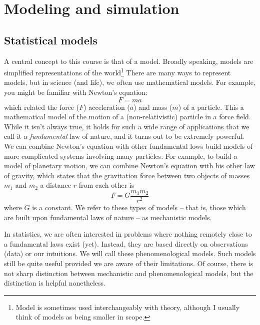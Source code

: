 \chapter{Modeling and simulation}
\section{Statistical models}

A central concept to this course is that of a {\dfn model}. %
Broadly speaking, models are simplified representations of the world\footnote{Model is sometimes used interchangeably with {\dfn theory}, although I usually think of models as being smaller in scope.} There are many ways to represent models, but in science (and life), we often use {\dfn mathematical models}.
For example, you might be familiar with Newton's equation:
\begin{equation}\label{eq:fma}
F = ma
\end{equation}
which related the force ($F$) acceleration ($a$) and mass ($m$) of a particle. This a mathematical model of the motion of a  (non-relativistic) particle in a force field. While it isn't always true, it holds for such a wide range of applications that we call it a \emph{fundamental} law of nature, and it turns out to be extremely powerful. We can combine Newton's equation with other fundamental lows build models of more complicated systems involving many particles. For example, to build a model of planetary motion, we can combine Newton's equation with his other law of gravity, which states that the gravitation force between two objects of masses $m_1$ and $m_2$ a distance $r$ from each other is
\begin{equation}
F = G\frac{m_1m_2}{r^2}
\end{equation}
where $G$ is a constant.
We refer to these types of models -- that is, those which are built upon fundamental laws of nature -- as {\dfn mechanistic} models.

In statistics, we are often interested in problems where nothing remotely close to a fundamental laws exist (yet). Instead, they are based directly on observations (data) or our intuitions. We will call these {\dfn phenomenological models}. Such models still be quite useful provided we are aware of their limitations. Of course, there is not sharp distinction between mechanistic and phenomenological models, but the distinction is helpful nonetheless. 


